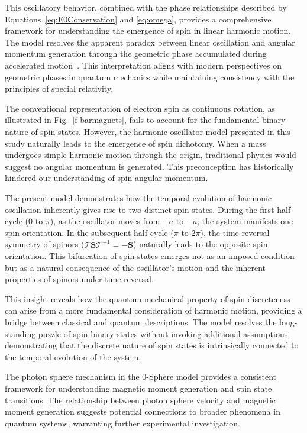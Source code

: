 \documentclass[%
 reprint,
 amsmath,amssymb,
 aps,
]{revtex4-1}
\numberwithin{equation}{section}%
\begin{document}
This oscillatory behavior, combined with the phase relationships described by Equations~\ref{eq:E0Conservation} and \ref{eq:omega}, provides a comprehensive framework for understanding the emergence of spin in linear harmonic motion. The model resolves the apparent paradox between linear oscillation and angular momentum generation through the geometric phase accumulated during accelerated motion~\cite{Berry1984, Aharonov1987}. This interpretation aligns with modern perspectives on geometric phases in quantum mechanics while maintaining consistency with the principles of special relativity.

The conventional representation of electron spin as continuous rotation, as illustrated in Fig.~\ref{f-barmagnets}, fails to account for the fundamental binary nature of spin states. However, the harmonic oscillator model presented in this study naturally leads to the emergence of spin dichotomy. When a mass undergoes simple harmonic motion through the origin, traditional physics would suggest no angular momentum is generated. This preconception has historically hindered our understanding of spin angular momentum.

The present model demonstrates how the temporal evolution of harmonic oscillation inherently gives rise to two distinct spin states. During the first half-cycle ($0$ to $\pi$), as the oscillator moves from $+a$ to $-a$, the system manifests one spin orientation. In the subsequent half-cycle ($\pi$ to $2\pi$), the time-reversal symmetry of spinors ($\mathcal{T}\hat{\boldsymbol{S}}\mathcal{T}^{-1} = -\hat{\boldsymbol{S}}$) naturally leads to the opposite spin orientation. This bifurcation of spin states emerges not as an imposed condition but as a natural consequence of the oscillator's motion and the inherent properties of spinors under time reversal.

This insight reveals how the quantum mechanical property of spin discreteness can arise from a more fundamental consideration of harmonic motion, providing a bridge between classical and quantum descriptions. The model resolves the long-standing puzzle of spin binary states without invoking additional assumptions, demonstrating that the discrete nature of spin states is intrinsically connected to the temporal evolution of the system.

The photon sphere mechanism in the 0-Sphere model provides a consistent framework for understanding magnetic moment generation and spin state transitions. The relationship between photon sphere velocity and magnetic moment generation suggests potential connections to broader phenomena in quantum systems, warranting further experimental investigation.
\end{document}
